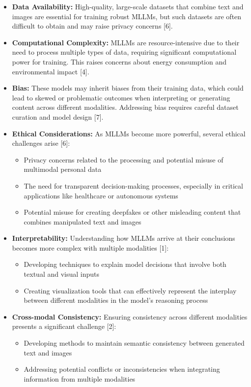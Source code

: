 \begin{itemize}
    \item \textbf{Data Availability:} High-quality, large-scale datasets that combine text and images are essential for training robust MLLMs, but such datasets are often difficult to obtain and may raise privacy concerns [6].
    
    \item \textbf{Computational Complexity:} MLLMs are resource-intensive due to their need to process multiple types of data, requiring significant computational power for training. This raises concerns about energy consumption and environmental impact [4].
    
    \item \textbf{Bias:} These models may inherit biases from their training data, which could lead to skewed or problematic outcomes when interpreting or generating content across different modalities. Addressing bias requires careful dataset curation and model design [7].
    
    \item \textbf{Ethical Considerations:} As MLLMs become more powerful, several ethical challenges arise [6]:
    \begin{itemize}
        \item Privacy concerns related to the processing and potential misuse of multimodal personal data
        \item The need for transparent decision-making processes, especially in critical applications like healthcare or autonomous systems
        \item Potential misuse for creating deepfakes or other misleading content that combines manipulated text and images
    \end{itemize}
    
    \item \textbf{Interpretability:} Understanding how MLLMs arrive at their conclusions becomes more complex with multiple modalities [1]:
    \begin{itemize}
        \item Developing techniques to explain model decisions that involve both textual and visual inputs
        \item Creating visualization tools that can effectively represent the interplay between different modalities in the model's reasoning process
    \end{itemize}
    
    \item \textbf{Cross-modal Consistency:} Ensuring consistency across different modalities presents a significant challenge [2]:
    \begin{itemize}
        \item Developing methods to maintain semantic consistency between generated text and images
        \item Addressing potential conflicts or inconsistencies when integrating information from multiple modalities
    \end{itemize}
    

\end{itemize}
